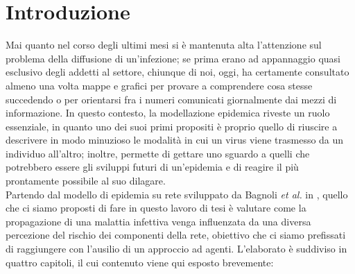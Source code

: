 \chapter*{Introduzione} 

\label{chap:intro}
Mai quanto nel corso degli ultimi mesi si è mantenuta alta l'attenzione sul problema della diffusione di un'infezione; se prima erano ad appannaggio quasi esclusivo degli addetti al settore, chiunque di noi, oggi, ha certamente consultato almeno una volta mappe e grafici per provare a comprendere cosa stesse succedendo o per orientarsi fra i numeri comunicati giornalmente dai mezzi di informazione. In questo contesto, la modellazione epidemica riveste un ruolo essenziale, in quanto uno dei suoi primi propositi è proprio quello di riuscire a descrivere in modo minuzioso le modalità in cui un virus viene trasmesso da un individuo all'altro; inoltre, permette di gettare uno sguardo a quelli che potrebbero essere gli sviluppi futuri di un'epidemia e di reagire il più prontamente possibile al suo dilagare. 
\\Partendo dal modello di epidemia su rete sviluppato da Bagnoli \textit{et al.} in \cite{Bagnoli2014}, quello che ci siamo proposti di fare in questo lavoro di tesi è valutare come la propagazione di una malattia infettiva venga influenzata da una diversa percezione del rischio dei componenti della rete, obiettivo che ci siamo prefissati di raggiungere con l'ausilio di un approccio ad agenti. L'elaborato è suddiviso in quattro capitoli, il cui contenuto viene qui esposto brevemente:
